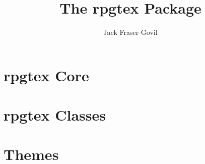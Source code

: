 \documentclass[size=12pt,theme=default]{rpgbook}
\title{The rpgtex Package}
\author{Jack Fraser-Govil}
\begin{document}
	\frontmatter
	\maketitle{}

	\tableofcontents
	\mainmatter{}


	\part{rpgtex Core}

		

	\part{rpgtex Classes}
		
		
		
	\part{Themes}
		
		
		
\end{document}
